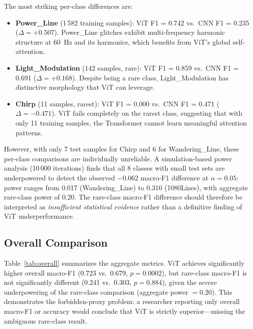 \documentclass[12pt]{article}
\newcommand{\vitMacroF}{0.723}
\newcommand{\vitRareF}{0.241}
\newcommand{\cnnMacroF}{0.679}
\newcommand{\cnnRareF}{0.303}
\newcommand{\pvalueOverall}{0.0002}
\newcommand{\pvalueRare}{0.884}
\newcommand{\powerLineDiffOthree}{+0.507}
\newcommand{\lightModDiff}{+0.168}
\newcommand{\chirpDiff}{-0.471}
\newcommand{\powerLineVitF}{0.742}
\newcommand{\powerLineCnnF}{0.235}
\begin{document}
The most striking per-class differences are:
\begin{itemize}
  \item \textbf{Power\_Line} (1\,582 training samples): ViT F1 = \powerLineVitF{}
    vs.\ CNN F1 = \powerLineCnnF{} ($\Delta = \powerLineDiffOthree$).
    Power\_Line glitches exhibit multi-frequency harmonic structure at 60~Hz
    and its harmonics, which benefits from ViT's global self-attention.
  \item \textbf{Light\_Modulation} (142 samples, rare): ViT F1 = 0.859
    vs.\ CNN F1 = 0.691 ($\Delta = \lightModDiff$).
    Despite being a rare class, Light\_Modulation has distinctive morphology
    that ViT can leverage.
  \item \textbf{Chirp} (11 samples, rarest): ViT F1 = 0.000
    vs.\ CNN F1 = 0.471 ($\Delta = \chirpDiff$).
    ViT fails completely on the rarest class, suggesting that with only 11
    training samples, the Transformer cannot learn meaningful attention
    patterns.
\end{itemize}

However, with only 7 test samples for Chirp and 6 for Wandering\_Line,
these per-class comparisons are individually unreliable.
A simulation-based power analysis (10\,000 iterations) finds that all 8 classes
with small test sets are underpowered to detect the observed $-0.062$ macro-F1 difference
at $\alpha = 0.05$: power ranges from 0.017 (Wandering\_Line) to 0.310
(1080Lines), with aggregate rare-class power of 0.20.
The rare-class macro-F1 difference should therefore be interpreted as
\emph{insufficient statistical evidence} rather than a definitive finding of
ViT underperformance.

\subsection{Overall Comparison}
\label{sec:overall}

Table~\ref{tab:overall} summarizes the aggregate metrics.
ViT achieves significantly higher overall macro-F1 (\vitMacroF{} vs.\
\cnnMacroF{}, $p = \pvalueOverall$), but rare-class macro-F1 is not
significantly different
(\vitRareF{} vs.\ \cnnRareF{}, $p = \pvalueRare$), given the severe
underpowering of the rare-class comparison (aggregate power $= 0.20$).
This demonstrates the forbidden-proxy problem: a researcher reporting only
overall macro-F1 or accuracy would conclude that ViT is strictly
superior---missing the ambiguous rare-class result.
\end{document}
